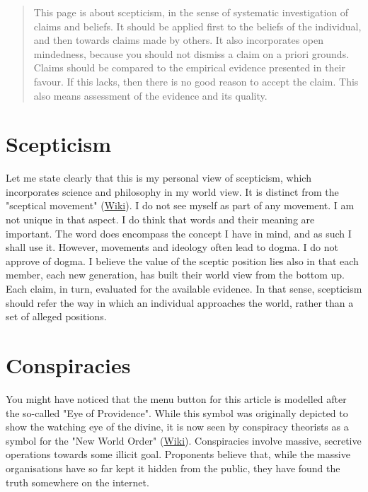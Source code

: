 \begin{abstract}
This page is about scepticism, in the sense of systematic investigation of claims and beliefs. It should be applied first to the beliefs
of the individual, and then towards claims made by others. It also incorporates open mindedness, because you should not dismiss a claim
on a priori grounds. Claims should be compared to the empirical evidence presented in their favour. If this lacks, then there is no good
reason to accept the claim. This also means assessment of the evidence and its quality.
\end{abstract}
\begin{multicols}{2}
\section{Scepticism}




Let me state clearly that this is my personal view of scepticism, which incorporates science and philosophy in my world view. It is distinct
from the "sceptical movement" (\href{https://en.wikipedia.org/wiki/Skeptical_movement}{Wiki}). I do not see myself as 
part of any movement. I am not unique in that aspect. I do think that words and their meaning are important. The word does encompass the
concept I have in mind, and as such I shall use it. However, movements and ideology often lead to dogma. I do not approve of dogma. I believe
the value of the sceptic position lies also in that each member, each new generation, has built their world view from the bottom up. Each claim,
in turn, evaluated for the available evidence. In that sense, scepticism should refer the way in which an individual approaches the world, rather
than a set of alleged positions.

\section{Conspiracies}

You might have noticed that the menu button for this article is modelled after the so-called "Eye of Providence". While this symbol was originally
depicted to show the watching eye of the divine, it is now seen by conspiracy theorists as a symbol for the "New World Order" (\href{https://en.wikipedia.org/wiki/New_World_Order_(conspiracy_theory)}{Wiki}).
Conspiracies involve massive, secretive operations towards some illicit goal. Proponents believe that, while the massive
organisations have so far kept it hidden from the public, they have found the truth somewhere on the internet.



\end{multicols}
